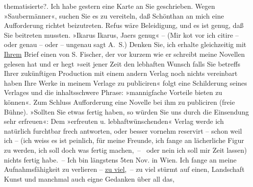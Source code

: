 \begin{ledgroupsized}[t]{13cm}
{{{                  thematisierte?}}}\label{K_L00384_1h}.\pend
           \pstart
           Ich habe gestern eine Karte an Sie geschrieben. Wegen »Saubermänner«, suchen Sie es zu vereiteln, daß Schönthan an mich eine Aufforderung richtet beizutreten. Refus
               wäre Beleidigung, und es ist genug, daß Sie beitre{\pb}ten mussten. »Ikarus Ikarus, Ja{\geminationm}ers
                  genug« – (Mir ko{\geminationm}t vor ich citire \label{K_L00384_2v}\label{K_L00384_2h} – oder genau – oder – ungenau sagt
               A. S.)\pend
           \pstart
           Denken Sie, ich erhalte gleichzeitig mit \uline{Ihrem} Brief
               einen von S. Fischer, der vor kurzem wie er
               schreibt meine Novellen gelesen hat und er hegt »seit jener Zeit den lebhaften Wunsch
                  {\pb}falls Sie betreffs Ihrer
               zukünftigen Production mit einem andern Verlag noch nichts vereinbart haben Ihre
               Werke in meinem Verlage zu publiciren« folgt eine Schilderung seines Verlages und die
               inhaltsschwere Phrase: »mannigfache Vorteile bieten zu können«. Zum Schluss
               Aufforderung eine Novelle bei ihm zu publiciren (freie
                  Bühne). »Sollten Sie {\pb}etwas
               fertig haben, so würden Sie uns durch die Einsendung sehr erfreuen«: Dem »erfreuten
               u. lebhaftwünschenden« Verlag werde ich natürlich furchtbar frech antworten, oder
               besser vornehm reservirt – schon weil ich – (ich weiss es ist peinlich, für meine
               Freunde, ich fange an lächerliche Figur zu werden, ich soll doch was fer{\pb}tig machen, –  oder nein ich soll
               mir Zeit lassen) nichts fertig habe. –\pend
           \pstart
           Ich bin längstens 5ten Nov. in Wien. Ich
               fange an meine Aufnahmsfähigkeit zu verlieren – \uline{zu
                  viel}, – zu viel stürmt auf einen, Landschaft Kunst und manchmal {\pb}auch eigne Gedanken über all das,

\end{ledgroupsized}
